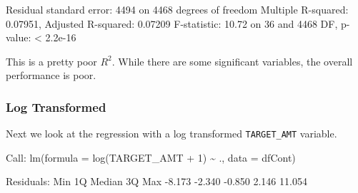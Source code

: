 \documentclass[]{article}
\begin{document}
Residual standard error: 4494 on 4468 degrees of freedom Multiple
R-squared: 0.07951, Adjusted R-squared: 0.07209 F-statistic: 10.72 on 36
and 4468 DF, p-value: \textless{} 2.2e-16

This is a pretty poor \(R^2\). While there are some significant
variables, the overall performance is poor.

\hypertarget{log-transformed}{%
\subsubsection{Log Transformed}\label{log-transformed}}

Next we look at the regression with a log transformed
\texttt{TARGET\_AMT} variable.

Call: lm(formula = log(TARGET\_AMT + 1) \textasciitilde{} ., data =
dfCont)

Residuals: Min 1Q Median 3Q Max -8.173 -2.340 -0.850 2.146 11.054
\end{document}
